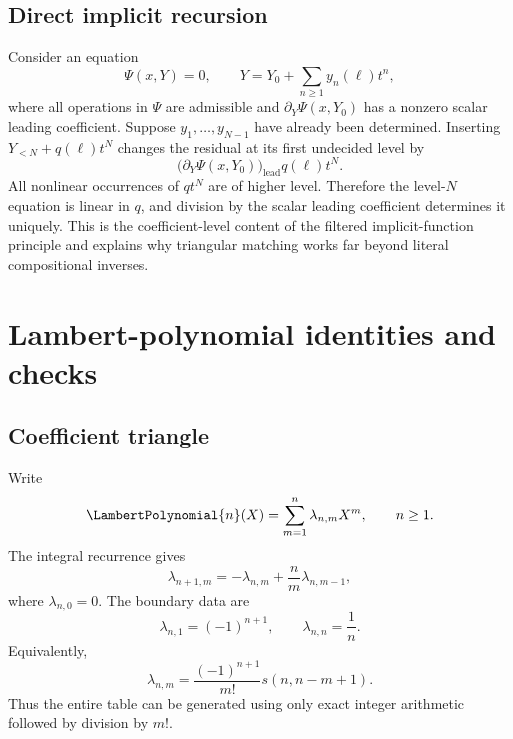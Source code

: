 \documentclass[11pt,oneside]{article}
\numberwithin{equation}{section}
\theoremstyle{definition}
\begin{document}
\subsection{Direct implicit recursion}

Consider an equation
\begin{equation}\label{eq:implicit-Psi-equation}
  \Psi(x,Y)=0,
  \qquad
  Y=Y_0+\sum_{n\ge1}y_n(\ell)t^n,
\end{equation}
where all operations in \(\Psi\) are admissible and
\(\partial_Y\Psi(x,Y_0)\) has a nonzero scalar leading coefficient.  Suppose
\(y_1,\ldots,y_{N-1}\) have already been determined.  Inserting
\(Y_{<N}+q(\ell)t^N\) changes the residual at its first undecided level by
\begin{equation}\label{eq:implicit-linearization-level}
  \bigl(\partial_Y\Psi(x,Y_0)\bigr)_{\mathrm{lead}}
  q(\ell)t^N.
\end{equation}
All nonlinear occurrences of \(q t^N\) are of higher level.  Therefore the
level-\(N\) equation is linear in \(q\), and division by the scalar leading
coefficient determines it uniquely.  This is the coefficient-level content of
the filtered implicit-function principle and explains why triangular matching
works far beyond literal compositional inverses.

\section{Lambert-polynomial identities and checks}\label{app:lambert}

\subsection{Coefficient triangle}

Write
\begin{equation}\label{eq:Lambert-coefficient-triangle}
  \LambertPolynomial{n}(X)=\sum_{m=1}^{n}\lambda_{n,m}X^m,
  \qquad n\ge1.
\end{equation}
The integral recurrence gives
\begin{equation}\label{eq:lambda-triangle-recurrence}
  \lambda_{n+1,m}
   =-\lambda_{n,m}+\frac{n}{m}\lambda_{n,m-1},
\end{equation}
where \(\lambda_{n,0}=0\).  The boundary data are
\begin{equation}\label{eq:lambda-boundary}
  \lambda_{n,1}=(-1)^{n+1},
  \qquad
  \lambda_{n,n}=\frac1n.
\end{equation}
Equivalently,
\begin{equation}\label{eq:lambda-Stirling}
  \lambda_{n,m}
   =\frac{(-1)^{n+1}}{m!}
      s(n,n-m+1).
\end{equation}
Thus the entire table can be generated using only exact integer arithmetic
followed by division by \(m!\).
\end{document}
